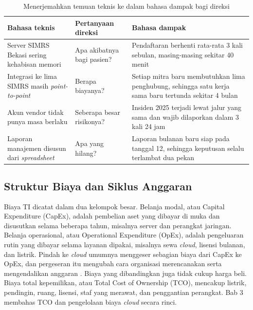 \begin{table}[!htb]
  \centering
  \footnotesize
  \caption{Menerjemahkan temuan teknis ke dalam bahasa dampak bagi direksi}
  \label{tab:ch01-terjemahan}
  \begin{tabularx}{\textwidth}{LP{2.5cm}L}
    \hline
    \textbf{Bahasa teknis} & \textbf{Pertanyaan direksi} & \textbf{Bahasa dampak} \\
    \hline
    Server SIMRS Bekasi sering kehabisan memori & Apa akibatnya bagi pasien? &
      Pendaftaran berhenti rata-rata 3 kali sebulan, masing-masing sekitar 40 menit \\
    \hline
    Integrasi ke lima SIMRS masih \textit{point-to-point} & Berapa biayanya? & Setiap
      mitra baru membutuhkan lima penghubung, sehingga satu kerja sama baru tertunda
      sekitar 4 bulan \\
    \hline
    Akun vendor tidak punya masa berlaku & Seberapa besar risikonya? & Insiden 2025
      terjadi lewat jalur yang sama dan wajib dilaporkan dalam 3 kali 24 jam \\
    \hline
    Laporan manajemen disusun dari \textit{spreadsheet} & Apa yang hilang? & Laporan
      bulanan baru siap pada tanggal 12, sehingga keputusan selalu terlambat dua pekan \\
    \hline
  \end{tabularx}
\end{table}

\subsection{Struktur Biaya dan Siklus Anggaran}

Biaya TI dicatat dalam dua kelompok besar. Belanja modal, atau Capital Expenditure
(CapEx), adalah pembelian aset yang dibayar di muka dan disusutkan selama beberapa
tahun, misalnya server dan perangkat jaringan. Belanja operasional, atau Operational
Expenditure (OpEx), adalah pengeluaran rutin yang dibayar selama layanan dipakai,
misalnya sewa \textit{cloud}, lisensi bulanan, dan listrik. Pindah ke \textit{cloud}
umumnya menggeser sebagian biaya dari CapEx ke OpEx, dan pergeseran itu mengubah cara
organisasi merencanakan serta mengendalikan anggaran \cite{storment2023}. Biaya yang
dibandingkan juga tidak cukup harga beli. Biaya total kepemilikan, atau Total Cost of
Ownership (TCO), mencakup listrik, pendingin, ruang, lisensi, staf yang merawat, dan
penggantian perangkat. Bab 3 membahas TCO dan pengelolaan biaya \textit{cloud} secara
rinci.

